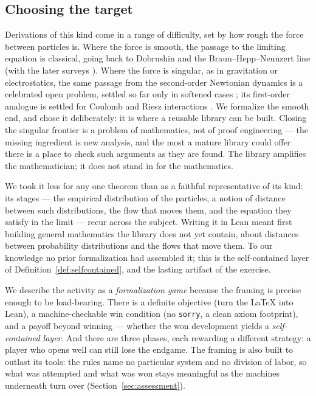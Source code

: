 \documentclass[11pt]{article}
\theoremstyle{plain}
\theoremstyle{definition}
\theoremstyle{remark}
\newcommand{\lean}[1]{\texttt{#1}}
\begin{document}
\subsection{Choosing the target}
Derivations of this kind come in a range of difficulty, set by how rough the force
between particles is. Where the force is smooth, the passage to the limiting
equation is classical, going back to Dobrushin \cite{Dobrushin} and the
Braun--Hepp--Neunzert line \cite{BraunHepp,Neunzert} (with the later surveys
\cite{Spohn,Golse}). Where the force is singular, as in gravitation or
electrostatics, the same passage from the second-order Newtonian dynamics is a
celebrated open problem, settled so far only in softened cases
\cite{hauray-jabin,lazarovici-pickl,feistl-held-pickl,feistl-held-pickl-2d};
its first-order analogue is settled for Coulomb and Riesz interactions
\cite{serfaty-coulomb,nguyen-rosenzweig-serfaty,nguyen-serfaty}. We formalize the smooth
end, and chose it deliberately: it is where a reusable library can be built. Closing
the singular frontier is a problem of mathematics, not of proof engineering --- the
missing ingredient is new analysis, and the most a mature library could offer there
is a place to check such arguments as they are found. The library amplifies the
mathematician; it does not stand in for the mathematics.

We took it less for any one theorem than as a faithful representative of its kind:
its stages --- the empirical distribution of the particles, a notion of distance
between such distributions, the flow that moves them, and the equation they satisfy
in the limit --- recur across the subject. Writing it in Lean meant first building
general mathematics the library does not yet contain, about distances between
probability distributions and the flows that move them. To our knowledge no prior
formalization had assembled it; this is the self-contained layer of
Definition~\ref{def:selfcontained}, and the lasting artifact of the exercise.

We describe the activity as a \emph{formalization game} because the framing is precise enough to be load-bearing.
There is a definite objective (turn the \LaTeX{} into Lean), a machine-checkable
win condition (no \lean{sorry}, a clean axiom footprint), and a payoff beyond
winning --- whether the won development yields a \emph{self-contained layer}. And there are three
phases, each rewarding a different strategy: a player who opens well can still lose
the endgame. The framing is also built to outlast its tools: the rules name no
particular system and no division of labor, so what was attempted and what was won
stays meaningful as the machines underneath turn over
(Section~\ref{sec:assessment}).
\end{document}
